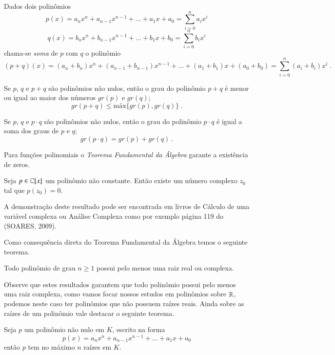  Dados dois polinômios
 \[p(x)= a_nx^n + a_{n-1}x^{n-1}+ \ldots + a_1x+ a_0= \sum_{i=0}^{n} a_ix^i\]
  \[q(x)= b_nx^n + b_{n-1}x^{n-1}+ \ldots + b_1x+ b_0= \sum_{i=0}^{n} b_ix^i\]
  chama-se \emph{soma} de $p$ com $q$ o polinômio
  \[(p+q)(x)= (a_n+ b_n)x^n + (a_{n-1}+b_{n-1})x^{n-1}+ \ldots + (a_1+b_1)x+ (a_0+b_0)= \sum_{i=0}^{n} (a_i+b_i)x^i \ .\]

  \begin{teo}
  Se $p$, $q$ e $p+q$ são polinômios não nulos, então o grau do polinômio $p+q$ é menor ou igual ao maior dos números $gr(p)$ e $gr(q)$;
  \[gr(p+q) \leq \text{máx}\{gr(p), gr(q)\} \ .\]
  \end{teo}

  \begin{teo}
  Se $p$, $q$ e $p \cdot q$ são polinômios não nulos, então o grau do polinômio $p \cdot q$ é igual a soma dos graus de $p$ e $q$;
  \[gr(p \cdot q) = gr(p) + gr(q) \ .\]
  \end{teo}

  Para funções polinomiais o \emph{Teorema Fundamental da Álgebra} garante a existência de zeros.

  \begin{teo}
  Seja $p \in \mathbb{C}[x]$ um polinômio não constante. Então existe um número complexo $z_0$ tal que $p(z_0)=0$.
  \end{teo}

  \begin{dem}
  A demonstração deste resultado pode ser encontrada em livros de Cálculo de uma variável complexa ou Análise Complexa como por exemplo página 119 do (SOARES, 2009).
  \end{dem}

  Como consequência direta do Teorema Fundamental da Álgebra temos o seguinte teorema.

  \begin{teo}
  Todo polinômio de grau $n \geq 1$ possui pelo menos uma raiz real ou complexa.
  \end{teo}

 Observe que estes resultados garantem que todo polinômio possui pelo menos uma raiz complexa, como vamos focar nossos estudos em polinômios sobre $\mathbb{R}$, podemos neste caso ter polinômios que não possuem raízes reais. Ainda sobre as raízes de um polinômio vale destacar o seguinte teorema.

 \begin{teo}
  Seja $p$ um polinômio não nulo em $K$, escrito na forma
  \[p(x)= a_nx^n + a_{n-1}x^{n-1}+ \ldots + a_1x+ a_0\]
   então $p$ tem no máximo $n$ raízes em $K$.
 \end{teo}

